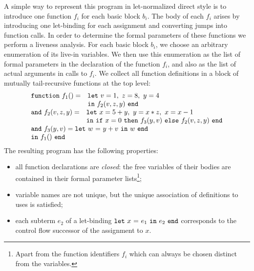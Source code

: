 A simple way to represent this program in let-normalized direct style
is to introduce one function $f_i$ for each basic block $b_i$. The
body of each $f_i$ arises by introducing one let-binding for each
assignment and converting jumps into function calls. In order to
determine the formal parameters of these functions we perform a
liveness analysis. For each basic block $b_i$, we choose an arbitrary
enumeration of its live-in variables. We then use this enumeration as
the list of formal parameters in the declaration of the function
$f_i$, and also as the list of actual arguments in calls to $f_i$. We
collect all function definitions in a block of mutually tail-recursive
functions at the top level:
\begin{equation}
\label{FunctionalConstructionProgram1}
\begin{array}{l}
  \begin{array}{ll}
    \mathtt{function}\ f_1() = 
     & \mathtt{let}\ v = 1,\ z = 8,\ y = 4\\
     & \mathtt{in}\ {f_2}\mathtt{(}{v,z,y}\mathtt{)}\ \mathtt{end}
  \end{array}\\
  \begin{array}{ll}
    \mathtt{and}\ f_2(v,z,y) =
     & \mathtt{let}\ x = {5+y},\ y = {x*z},\ x = {x-1}\\
     & \mathtt{in}\ {\mathtt{if}\ {x=0}\ \mathtt{then}\ {{f_3}\mathtt{(}{y,v}\mathtt{)}}\ \mathtt{else}\ {{f_2}\mathtt{(}{v,z,y}\mathtt{)}}}\
       \mathtt{end}
  \end{array}\\
  \begin{array}{l}
    \mathtt{and}\ f_3(y,v) = \mathtt{let}\ {w}\ \mathtt{=}\ {y+v}\ \mathtt{in}\ {w}\ \mathtt{end}\\
    \mathtt{in}\ f_1()\ \mathtt{end}
  \end{array} 
\end{array}
\end{equation}
The resulting program has the following properties:
\begin{itemize}
\item 
  all function declarations are \emph{closed}: the free variables of
  their bodies are contained in their formal parameter
  lists\footnote{Apart from the function identifiers $f_i$ which can
  always be chosen distinct from the variables.};

\item
  variable names are not unique, but the unique association of
  definitions to uses is satisfied;

\item
  each subterm $e_2$ of a let-binding $\mathtt{let}\ {x}\ \mathtt{=}\ {e_1}\ \mathtt{in}\ {e_2}\ \mathtt{end}$
  corresponds to the control flow successor of the assignment to $x$.

\end{itemize}
